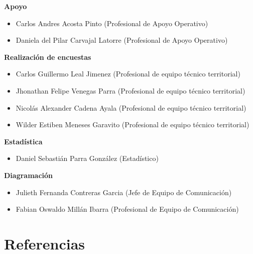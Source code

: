 \documentclass[
]{book}
\begin{document}
\textbf{Apoyo}

\begin{itemize}\item  Carlos Andres Acosta Pinto (Profesional de Apoyo Operativo)\item  Daniela del Pilar Carvajal Latorre (Profesional de Apoyo Operativo)\end{itemize}

\textbf{Realización de encuestas}

\begin{itemize}\item  Carlos Guillermo Leal Jimenez (Profesional de equipo técnico territorial)\item  Jhonathan Felipe Venegas Parra (Profesional de equipo técnico territorial)\item  Nicolás Alexander Cadena Ayala (Profesional de equipo técnico territorial)\item  Wilder Estiben Meneses Garavito (Profesional de equipo técnico territorial)\end{itemize}

\textbf{Estadística}

\begin{itemize}\item  Daniel Sebastián Parra González (Estadístico)\end{itemize}

\textbf{Diagramación}

\begin{itemize}\item  Julieth Fernanda Contreras Garcia (Jefe de Equipo de Comunicación)\item  Fabian Oswaldo Millán Ibarra (Profesional de Equipo de Comunicación)\end{itemize}

\hypertarget{referencias}{%
\chapter*{Referencias}\label{referencias}}
\end{document}
